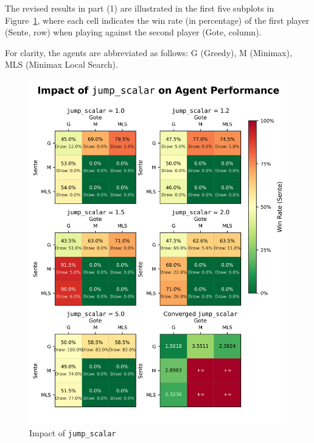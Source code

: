 The revised results in part (1) are illustrated in the first five subplots in Figure~\ref{fig:jump}, where each cell indicates the win rate (in percentage) of the first player (Sente, row) when playing against the second player (Gote, column).

For clarity, the agents are abbreviated as follows: G (Greedy), M (Minimax), MLS (Minimax Local Search).

\begin{figure}[h]
    \centering
    \includegraphics[width=1\columnwidth]{figures/jump_scalar.png}
    \caption{Impact of \texttt{jump\_scalar}}
    \label{fig:jump}
\end{figure}